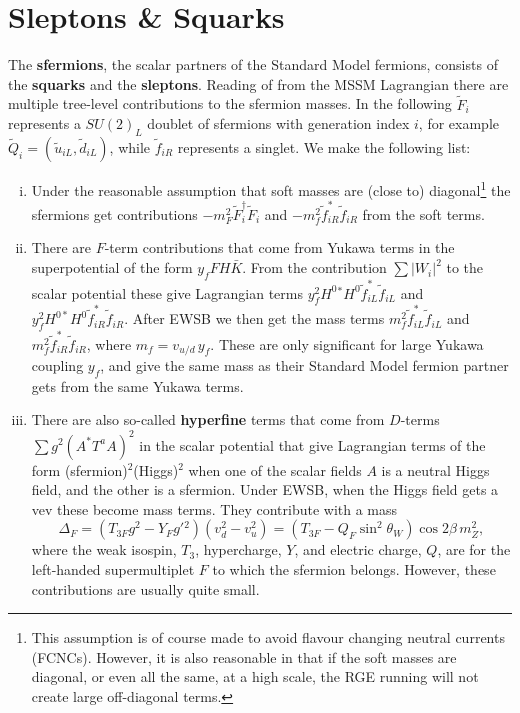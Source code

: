 \documentclass[notes.tex]{subfiles}
\begin{document}
\section{Sleptons \& Squarks}
The {\bf sfermions}, the scalar partners of the Standard Model fermions, consists of the {\bf squarks} and the {\bf sleptons}. Reading of from the MSSM Lagrangian there  are multiple tree-level contributions to the sfermion masses. In the following $\tilde{F}_i$ represents a $SU(2)_L$ doublet of sfermions with generation index $i$, for example $\tilde Q_i=(\tilde u_{iL},\tilde d_{iL})$, while $\tilde{f}_{iR}$ represents a singlet.
We make the following list: 
\begin{enumerate}[i)]
\item Under the reasonable assumption that soft masses are (close to) diagonal\footnote{This assumption is of course made to avoid flavour changing neutral currents (FCNCs). However, it is also reasonable in that if the soft masses are diagonal, or even all the same, at a high scale, the RGE running will not create large off-diagonal terms. } the sfermions get contributions $-m_F^2\tilde{F}_i^\dagger \tilde{F}_i$ and $-m_{f}^2\tilde{f}^*_{iR}\tilde{f}_{iR}$ from the soft terms.
\item There are $F$-term contributions that come from Yukawa terms in the superpotential of the form $y_fFH\bar K$. From the contribution $\sum |W_i|^2$ to the scalar potential
these give Lagrangian terms $y_f^2H^0{}^*H^0\tilde{f}^*_{iL}\tilde{f}_{iL}$ and $y_f^2 H^{0*}H^0\tilde{f}^*_{iR}\tilde{f}_{iR}$. After EWSB we then get the mass terms $m_f^2 \tilde{f}^*_{iL}\tilde{f}_{iL}$ and $m_f^2\tilde{f}^*_{iR}\tilde{f}_{iR}$, where $m_f = v_{u/d}\,y_f$. These are only significant for large Yukawa coupling $y_f$, and give the same mass as their Standard Model fermion partner gets from the same Yukawa terms.
\item There are also so-called {\bf hyperfine} terms that come from $D$-terms $\sum g^2(A^*T^aA)^2$ in the scalar potential that give Lagrangian terms of the form (sfermion)$^2$(Higgs)$^2$ when one of the scalar fields $A$ is a neutral Higgs field, and the other is a sfermion. Under EWSB, when the Higgs field gets a vev these become mass terms. They contribute with a mass \[\Delta_F = (T_{3F}g^2 - Y_Fg'{}^2)(v_d^2-v_u^2) = (T_{3F} - Q_F\sin^2\theta_W)\cos2\beta\, m_Z^2,\] where the weak isospin, $T_3$, hypercharge, $Y$, and electric charge, $Q$, are for the left-handed supermultiplet $F$ to which the sfermion belongs. However, these contributions are usually quite small.

\end{enumerate}
\end{document}
